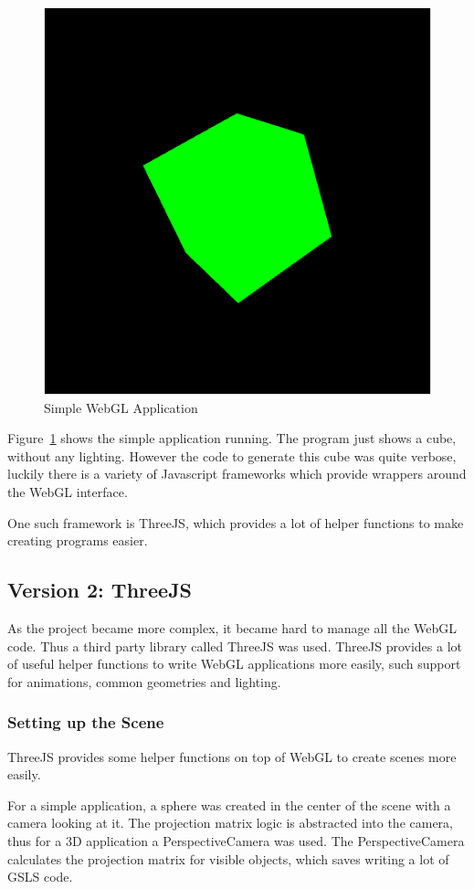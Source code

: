 \documentclass[]{article}
\begin{document}
\begin{figure}[H]
   \centering
   \includegraphics[width=0.5\linewidth]{images/webgl_cube}
   \caption{Simple WebGL Application}
   \label{fig:webgl_cube}
\end{figure}

Figure~\ref{fig:webgl_cube} shows the simple application running.
The program just shows a cube, without any lighting.
However the code to generate this cube was quite verbose, luckily there is a variety of Javascript frameworks which provide wrappers around the WebGL interface.

One such framework is ThreeJS, which provides a lot of helper functions to make creating programs easier.

\subsection{Version 2: ThreeJS}

As the project became more complex, it became hard to manage all the WebGL code.
Thus a third party library called ThreeJS was used.
ThreeJS provides a lot of useful helper functions to write WebGL applications more easily,
such support for animations, common geometries and lighting.

\subsubsection{Setting up the Scene}

ThreeJS provides some helper functions on top of WebGL to create scenes more easily.

For a simple application, a sphere was created in the center of the scene with a camera looking at it.
The projection matrix logic is abstracted into the camera, thus for a 3D application a PerspectiveCamera was used.
The PerspectiveCamera calculates the projection matrix for visible objects, which saves writing a lot of GSLS code.
\end{document}
